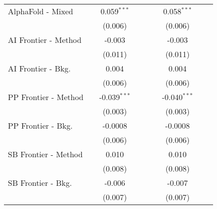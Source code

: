 \begin{tabular}{lcccccccc}
   AlphaFold - Mixed                              &              & 0.059$^{***}$  &       &       &              & 0.058$^{***}$  &       &   \\   
                                                  &              & (0.006)        &       &       &              & (0.006)        &       &   \\   
   AI Frontier - Method                           &              & -0.003         &       &       &              & -0.003         &       &   \\   
                                                  &              & (0.011)        &       &       &              & (0.011)        &       &   \\   
   AI Frontier - Bkg.                             &              & 0.004          &       &       &              & 0.004          &       &   \\   
                                                  &              & (0.006)        &       &       &              & (0.006)        &       &   \\   
   PP Frontier - Method                           &              & -0.039$^{***}$ &       &       &              & -0.040$^{***}$ &       &   \\   
                                                  &              & (0.003)        &       &       &              & (0.003)        &       &   \\   
   PP Frontier - Bkg.                             &              & -0.0008        &       &       &              & -0.0008        &       &   \\   
                                                  &              & (0.006)        &       &       &              & (0.006)        &       &   \\   
   SB Frontier - Method                           &              & 0.010          &       &       &              & 0.010          &       &   \\   
                                                  &              & (0.008)        &       &       &              & (0.008)        &       &   \\   
   SB Frontier - Bkg.                             &              & -0.006         &       &       &              & -0.007         &       &   \\   
                                                  &              & (0.007)        &       &       &              & (0.007)        &       &   \\   

\end{tabular}
